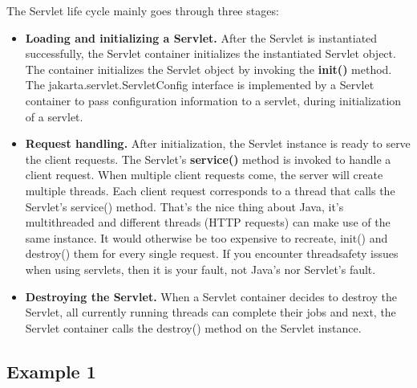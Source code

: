 The Servlet life cycle mainly goes through three stages:\cite{servlet_lifecycle}

\begin{itemize}
\item \textbf{Loading and initializing a Servlet.} After the Servlet is instantiated successfully, the Servlet container initializes the instantiated Servlet object. The container initializes the Servlet object by invoking the \textbf{init()} method. The jakarta.servlet.ServletConfig interface is implemented by a Servlet container to pass configuration information to a servlet, during initialization of a servlet.
\item \textbf{Request handling.} After initialization, the Servlet instance is ready to serve the client requests.  The Servlet's \textbf{service()} method is invoked to handle a client request. When multiple client requests come, the server will create multiple threads. Each client request corresponds to a thread that calls the Servlet's service() method.  That's the nice thing about Java, it's multithreaded and different threads (HTTP requests) can make use of the same instance. It would otherwise be too expensive to recreate, init() and destroy() them for every single request. If you encounter threadsafety issues when using servlets, then it is your fault, not Java's nor Servlet's fault.
\item \textbf{Destroying the Servlet.} When a Servlet container decides to destroy the Servlet,  all currently running threads can complete their jobs and next, the Servlet container calls the destroy() method on the Servlet instance.
\end{itemize}

\subsection{Example 1}

